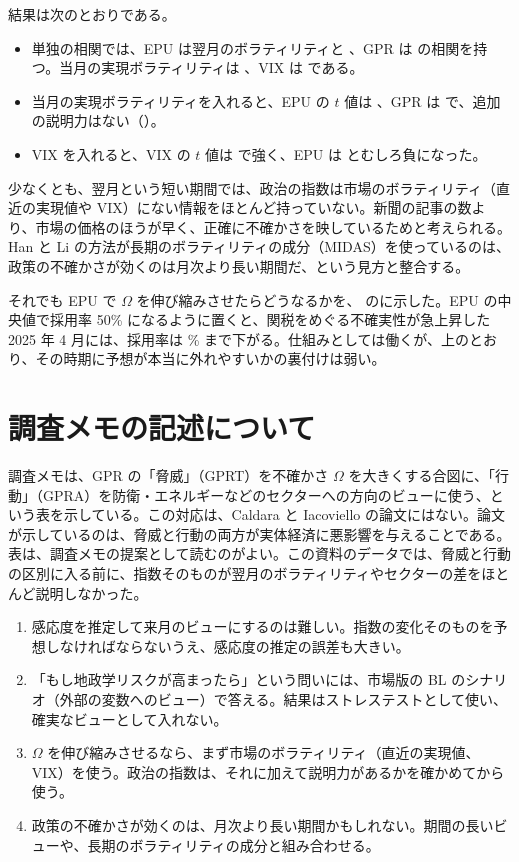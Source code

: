 結果は次のとおりである。

\begin{itemize}
\item 単独の相関では、EPU は翌月のボラティリティと 、GPR は  の相関を持つ。当月の実現ボラティリティは 、VIX は  である。
\item 当月の実現ボラティリティを入れると、EPU の $t$ 値は 、GPR は  で、追加の説明力はない（）。
\item VIX を入れると、VIX の $t$ 値は  で強く、EPU は  とむしろ負になった。
\end{itemize}

少なくとも、翌月という短い期間では、政治の指数は市場のボラティリティ（直近の実現値や VIX）にない情報をほとんど持っていない。新聞の記事の数より、市場の価格のほうが早く、正確に不確かさを映しているためと考えられる。Han と Li の方法が長期のボラティリティの成分（MIDAS）を使っているのは、政策の不確かさが効くのは月次より長い期間だ、という見方と整合する。

それでも EPU で $\Omega$ を伸び縮みさせたらどうなるかを、 のに示した。EPU の中央値で採用率 50\% になるように置くと、関税をめぐる不確実性が急上昇した 2025 年 4 月には、採用率は \% まで下がる。仕組みとしては働くが、上のとおり、その時期に予想が本当に外れやすいかの裏付けは弱い。

\section{調査メモの記述について}

調査メモは、GPR の「脅威」（GPRT）を不確かさ $\Omega$ を大きくする合図に、「行動」（GPRA）を防衛・エネルギーなどのセクターへの方向のビューに使う、という表を示している。この対応は、Caldara と Iacoviello の論文にはない。論文が示しているのは、脅威と行動の両方が実体経済に悪影響を与えることである。表は、調査メモの提案として読むのがよい。この資料のデータでは、脅威と行動の区別に入る前に、指数そのものが翌月のボラティリティやセクターの差をほとんど説明しなかった。

\begin{tipbox}[コツ：政治のファクターを使うとき]
\begin{enumerate}
\item 感応度を推定して来月のビューにするのは難しい。指数の変化そのものを予想しなければならないうえ、感応度の推定の誤差も大きい。
\item 「もし地政学リスクが高まったら」という問いには、市場版の BL のシナリオ（外部の変数へのビュー）で答える。結果はストレステストとして使い、確実なビューとして入れない。
\item $\Omega$ を伸び縮みさせるなら、まず市場のボラティリティ（直近の実現値、VIX）を使う。政治の指数は、それに加えて説明力があるかを確かめてから使う。
\item 政策の不確かさが効くのは、月次より長い期間かもしれない。期間の長いビューや、長期のボラティリティの成分と組み合わせる。
\end{enumerate}
\end{tipbox}


